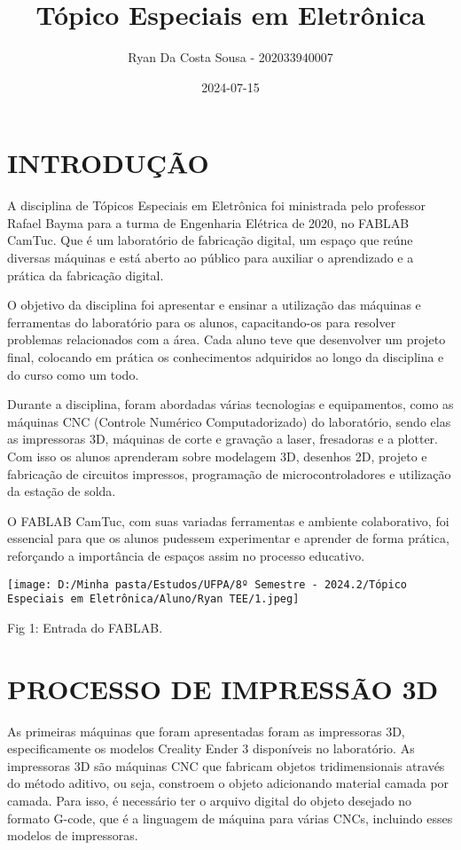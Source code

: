 \documentclass[
]{book}
\title{Tópico Especiais em Eletrônica}
\author{Ryan Da Costa Sousa - 202033940007}
\date{2024-07-15}
\begin{document}
\maketitle

{
\setcounter{tocdepth}{1}
\tableofcontents
}
\chapter{INTRODUÇÃO}\label{introduuxe7uxe3o}

A disciplina de Tópicos Especiais em Eletrônica foi ministrada pelo professor Rafael Bayma para a turma de Engenharia Elétrica de 2020, no FABLAB CamTuc. Que é um laboratório de fabricação digital, um espaço que reúne diversas máquinas e está aberto ao público para auxiliar o aprendizado e a prática da fabricação digital.

O objetivo da disciplina foi apresentar e ensinar a utilização das máquinas e ferramentas do laboratório para os alunos, capacitando-os para resolver problemas relacionados com a área. Cada aluno teve que desenvolver um projeto final, colocando em prática os conhecimentos adquiridos ao longo da disciplina e do curso como um todo.

Durante a disciplina, foram abordadas várias tecnologias e equipamentos, como as máquinas CNC (Controle Numérico Computadorizado) do laboratório, sendo elas as impressoras 3D, máquinas de corte e gravação a laser, fresadoras e a plotter. Com isso os alunos aprenderam sobre modelagem 3D, desenhos 2D, projeto e fabricação de circuitos impressos, programação de microcontroladores e utilização da estação de solda.

O FABLAB CamTuc, com suas variadas ferramentas e ambiente colaborativo, foi essencial para que os alunos pudessem experimentar e aprender de forma prática, reforçando a importância de espaços assim no processo educativo.

\texttt{[image: D:/Minha pasta/Estudos/UFPA/8º Semestre - 2024.2/Tópico Especiais em Eletrônica/Aluno/Ryan TEE/1.jpeg]}

Fig 1: Entrada do FABLAB.

\chapter{PROCESSO DE IMPRESSÃO 3D}\label{processo-de-impressuxe3o-3d}

As primeiras máquinas que foram apresentadas foram as impressoras 3D, especificamente os modelos Creality Ender 3 disponíveis no laboratório. As impressoras 3D são máquinas CNC que fabricam objetos tridimensionais através do método aditivo, ou seja, constroem o objeto adicionando material camada por camada. Para isso, é necessário ter o arquivo digital do objeto desejado no formato G-code, que é a linguagem de máquina para várias CNCs, incluindo esses modelos de impressoras.
\end{document}
